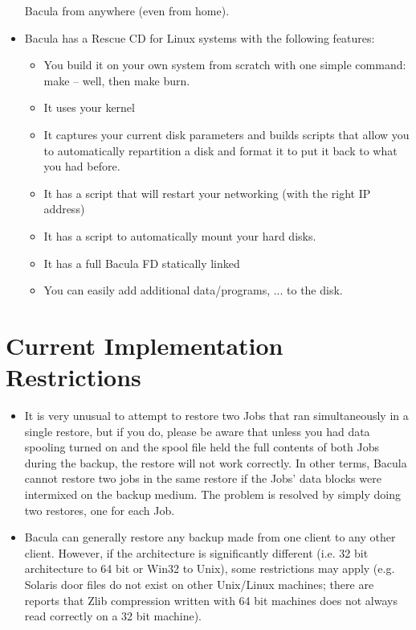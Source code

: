 \begin{itemize}
   Bacula from anywhere (even from home).
\item Bacula has a Rescue CD for Linux systems with the following features:  
   \begin{itemize}
   \item You build it on your own system from scratch with one simple  command:
      make -- well, then make burn. 
   \item It uses your kernel  
   \item It captures your current disk parameters and builds scripts that  allow
      you to automatically repartition a disk and format it to  put it back to what
      you had before. 
   \item It has a script that will restart your networking (with the right  IP
      address)  
   \item It has a script to automatically mount your hard disks.  
   \item It has a full Bacula FD statically linked  
   \item You can easily add additional data/programs, ... to the disk.  
   \end{itemize}

\end{itemize}

\section{Current Implementation Restrictions}

\begin{itemize}
\item It is very unusual to attempt to restore two Jobs
   that ran simultaneously in a single restore, but if
   you do, please be aware that unless you had
   data spooling turned on and the spool file held the full
   contents of both Jobs during the backup, the restore will not
   work correctly. In other terms, Bacula cannot restore
   two jobs in the same restore if the Jobs' data blocks were
   intermixed on the backup medium. The problem is resolved by
   simply doing two restores, one for each Job. 
\item Bacula can generally restore any backup made from one client
   to any other client. However, if the architecture is significantly
   different (i.e. 32 bit architecture to 64 bit or Win32 to Unix),
   some restrictions may apply (e.g. Solaris door files do not exist
   on other Unix/Linux machines; there are reports that Zlib compression
   written with 64 bit machines does not always read correctly on a 32 bit
   machine).
\end{itemize}


